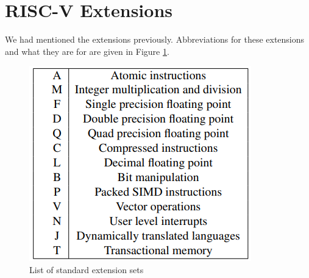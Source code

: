 \section{RISC-V Extensions}
We had mentioned the extensions previously. Abbreviations for these extensions and what they are for are given in Figure \ref{fig:list_of_standard_extension_sets}.
\begin{figure}[h!]
    \centering
    \includegraphics{riscv/list_of_standard_extension_sets.png}
    \caption{List of standard extension sets \cite{erfan}}
    \label{fig:list_of_standard_extension_sets}
\end{figure}

